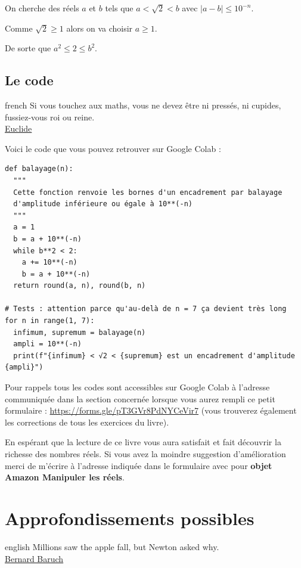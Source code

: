 \documentclass[a4paper, 11pt, twoside]{book}
\begin{document}
On cherche des réels \(a\) et \(b\) tels que \(a < \sqrt{2} < b\) avec
\(\lvert a - b \rvert \leq 10^{-n}\).

Comme \(\sqrt{2} \geq 1\) alors on va choisir \(a \geq 1\).

De sorte que \(a^2 \leq 2 \leq b^2\).
\stopcontents[level-2]

\chapter{Le code}
\label{sec:org5c6ef71}
\startcontents[level-2]

\begin{foreigndisplayquote}{french}
Si vous touchez aux maths, vous ne devez être ni pressés, ni
cupides, fussiez-vous roi ou reine. \\

\href{https://amzn.to/3KU1CZE}{Euclide} 
\end{foreigndisplayquote}

Voici le code que vous pouvez retrouver sur Google Colab :

\begin{verbatim}
def balayage(n):
  """
  Cette fonction renvoie les bornes d'un encadrement par balayage
  d'amplitude inférieure ou égale à 10**(-n)
  """
  a = 1
  b = a + 10**(-n)
  while b**2 < 2:
    a += 10**(-n)
    b = a + 10**(-n)
  return round(a, n), round(b, n)

# Tests : attention parce qu'au-delà de n = 7 ça devient très long 
for n in range(1, 7):
  infimum, supremum = balayage(n)
  ampli = 10**(-n)
  print(f"{infimum} < √2 < {supremum} est un encadrement d'amplitude {ampli}")
\end{verbatim}

Pour rappels tous les codes sont accessibles sur Google Colab à
l'adresse communiquée dans la section concernée lorsque vous
aurez rempli ce petit formulaire :
\url{https://forms.gle/pT3GVr8PdNYCeVir7} (vous trouverez également
les corrections de tous les exercices du livre).

En espérant que la lecture de ce livre vous aura satisfait et fait
découvrir la richesse des nombres réels. Si vous avez la moindre
suggestion d'amélioration merci de m'écrire à l'adresse
indiquée dans le formulaire avec pour \textbf{objet Amazon Manipuler les réels}.
\stopcontents[level-2]
\stopcontents[level-1]

\part{Approfondissements possibles}
\label{sec:org37588f5}
\startcontents[level-1]
\begin{foreigndisplayquote}{english}
Millions saw the apple fall, but Newton asked why.\\

\href{https://en.wikipedia.org/wiki/Bernard\_Baruch}{Bernard Baruch}
\end{foreigndisplayquote}
\end{document}
